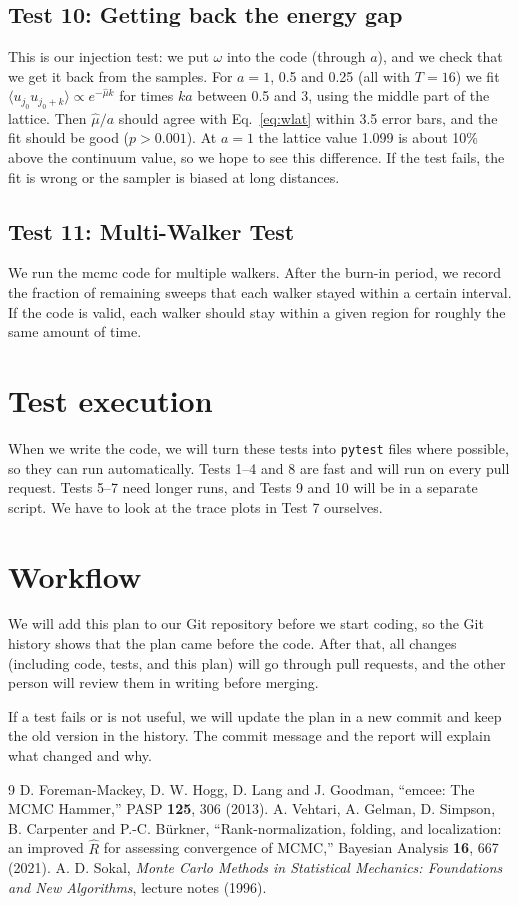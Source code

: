 \documentclass[11pt]{article}
\begin{document}
\subsection*{Test 10: Getting back the energy gap}
This is our injection test: we put $\omega$ into the code (through $a$), and we check that we get it back from the samples. For $a = 1$, 0.5 and 0.25 (all with $T = 16$) we fit $\langle u_{j_0}u_{j_0+k}\rangle \propto e^{-\hat\mu k}$ for times $ka$ between 0.5 and 3, using the middle part of the lattice. Then $\hat\mu/a$ should agree with Eq.~\eqref{eq:wlat} within 3.5 error bars, and the fit should be good ($p > 0.001$). At $a = 1$ the lattice value 1.099 is about 10\% above the continuum value, so we hope to see this difference. If the test fails, the fit is wrong or the sampler is biased at long distances.

\subsection*{Test 11: Multi-Walker Test}
We run the mcmc code for multiple walkers. After the burn-in period, we record the fraction of remaining sweeps that each walker stayed within a certain interval. If the code is valid, each walker should stay within a given region for roughly the same amount of time. 


\section{Test execution}
When we write the code, we will turn these tests into \texttt{pytest} files where possible, so they can run automatically. Tests 1--4 and 8 are fast and will run on every pull request. Tests 5--7 need longer runs, and Tests 9 and 10 will be in a separate script. We have to look at the trace plots in Test 7 ourselves.



\section{Workflow}
We will add this plan to our Git repository before we start coding, so the Git history shows that the plan came before the code. After that, all changes (including code, tests, and this plan) will go through pull requests, and the other person will review them in writing before merging.

If a test fails or is not useful, we will update the plan in a new commit and keep the old version in the history. The commit message and the report will explain what changed and why. 


\begin{thebibliography}{9}
 D. Foreman-Mackey, D. W. Hogg, D. Lang and J. Goodman, ``emcee: The MCMC Hammer,'' PASP \textbf{125}, 306 (2013).
 A. Vehtari, A. Gelman, D. Simpson, B. Carpenter and P.-C. B\"urkner, ``Rank-normalization, folding, and localization: an improved $\hat R$ for assessing convergence of MCMC,'' Bayesian Analysis \textbf{16}, 667 (2021).
 A. D. Sokal, \emph{Monte Carlo Methods in Statistical Mechanics: Foundations and New Algorithms}, lecture notes (1996).
\end{thebibliography}
\end{document}
